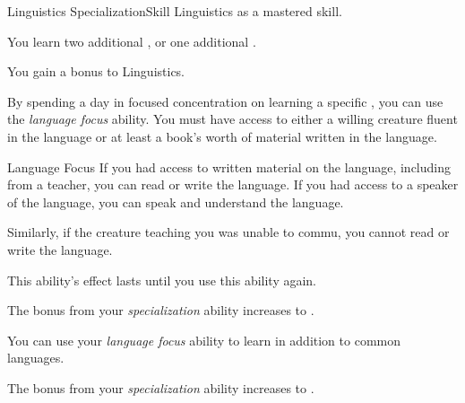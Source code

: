     \begin{feat}{Linguistics Specialization}{Skill}
        \featpre Linguistics as a mastered skill.

         You learn two additional , or one additional .

         You gain a  bonus to Linguistics.

         By spending a day in focused concentration on learning a specific , you can use the \textit{language focus} ability.
        You must have access to either a willing creature fluent in the language or at least a book's worth of material written in the language.
        \begin{ability}{Language Focus}
            If you had access to written material on the language, including from a teacher, you can read or write the language.
            If you had access to a speaker of the language, you can speak and understand the language.
            
            Similarly, if the creature teaching you was unable to commu, you cannot read or write the language.

            This ability's effect lasts until you use this ability again.
        \end{ability}

         The bonus from your \textit{specialization} ability increases to .

         You can use your \textit{language focus} ability to learn  in addition to common languages.

         The bonus from your \textit{specialization} ability increases to .
    \end{feat}


